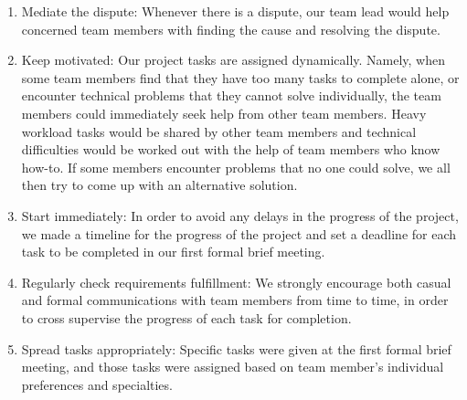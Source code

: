 \documentclass[12pt]{article}
\begin{document}
\begin{enumerate}
    \item Mediate the dispute: \newline
          Whenever there is a dispute, our team lead would help concerned team members with finding the cause and resolving the dispute.
    \item Keep motivated: \newline
          Our project tasks are assigned dynamically. Namely, when some team members find that they have too many tasks to complete alone, or encounter technical problems that they cannot solve individually, the team members could immediately seek help from other team members. Heavy workload tasks would be shared by other team members and technical difficulties would be worked out with the help of team members who know how-to. If some members encounter problems that no one could solve, we all then try to come up with an alternative solution.
    \item Start immediately: \newline
          In order to avoid any delays in the progress of the project, we made a timeline for the progress of the project and set a deadline for each task to be completed in our first formal brief meeting.
    \item Regularly check requirements fulfillment: \newline
          We strongly encourage both casual and formal communications with team members from time to time, in order to cross supervise the progress of each task for completion.
    \item Spread tasks appropriately: \newline
          Specific tasks were given at the first formal brief meeting, and those tasks were assigned based on team member's individual preferences and specialties.
\end{enumerate}
\end{document}

